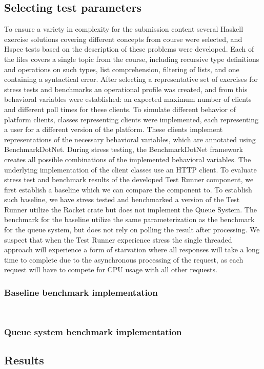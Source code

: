 \subsection{Selecting test parameters}
To ensure a variety in complexity for the submission content several Haskell exercise solutions covering different concepts from course were selected, and Hspec tests based on the description of these problems were developed.  
Each of the files covers a single topic from the course, including recursive type definitions and operations on such types, list comprehension, filtering of lists, and one containing a syntactical error.
After selecting a representative set of exercises for stress tests and benchmarks an operational profile was created, and from this behavioral variables were established: an expected maximum number of clients and different poll times for these clients.
To simulate different behavior of platform clients, classes representing clients were implemented, each representing a user for a different version of the platform.
These clients implement representations of the necessary behavioral variables, which are annotated using BenchmarkDotNet.
During stress testing, the BenchmarkDotNet framework creates all possible combinations of the implemented behavioral variables.
The underlying implementation of the client classes use an HTTP client.
To evaluate stress test and benchmark results of the developed Test Runner component, we first establish a baseline which we can compare the component to. To establish such baseline, we have stress tested and benchmarked a version of the Test Runner utilize the Rocket crate but does not implement the Queue System. 
The benchmark for the baseline utilize the same parameterization as the benchmark for the queue system, but does not rely on polling the result after processing. 
We suspect that when the Test Runner experience stress the single threaded approach will experience a form of starvation where all responses will take a long time to complete due to the asynchronous processing of the request, as each request will have to compete for CPU usage with all other requests.

\subsubsection{Baseline benchmark implementation}
\begin{lstlisting}[language=cs, escapechar=~, caption={C\# code showing xxxxxx}, label={lst:baselineBench}]
    
\end{lstlisting}




\subsubsection{Queue system benchmark implementation}

\subsection{Results}
